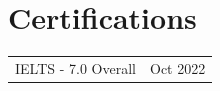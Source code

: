 \documentclass[a4paper,12pt]{article}
\begin{document}
\section{Certifications}
\begin{tabularx}{\linewidth}{@{}X r@{}}
IELTS - 7.0 Overall & \normalsize{Oct 2022} \\
\end{tabularx}
\end{document}
